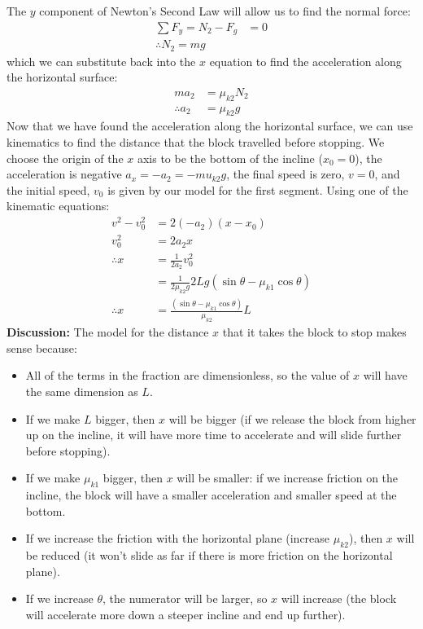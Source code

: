 \begin{example}
The $y$ component of Newton's Second Law will allow us to find the normal force:
\begin{align*}
\sum F_y = N_2 -F_g &=0\\
\therefore N_2 = mg
\end{align*}
which we can substitute back into the $x$ equation to find the acceleration along the horizontal surface:
\begin{align*}
ma_2 &=\mu_{k2}N_2 \\
\therefore a_2&=\mu_{k2}g
\end{align*}
Now that we have found the acceleration along the horizontal surface, we can use kinematics to find the distance that the block travelled before stopping. We choose the origin of the $x$ axis to be the bottom of the incline ($x_0=0$), the acceleration is negative $a_x = -a_2 = -mu_{k2}g$, the final speed is zero, $v=0$, and the initial speed, $v_0$ is given by our model for the first segment. Using one of the kinematic equations:
\begin{align*}
v^2-v_0^2&=2(-a_2)(x-x_0)\\
v_0^2&=2a_2x\\
\therefore x &=\frac{1}{2a_2}v_0^2\\
&=\frac{1}{2\mu_{k2}g}2Lg(\sin\theta-\mu_{k1}\cos\theta)\\
\therefore x&=\frac{(\sin\theta-\mu_{k1}\cos\theta)}{\mu_{k2}}L
\end{align*}
\textbf{Discussion:} The model for the distance $x$ that it takes the block to stop makes sense because:
\begin{itemize}
\item All of the terms in the fraction are dimensionless, so the value of $x$ will have the same dimension as $L$. 
\item If we make $L$ bigger, then $x$ will be bigger (if we release the block from higher up on the incline, it will have more time to accelerate and will slide further before stopping).
\item If we make $\mu_{k1}$ bigger, then $x$ will be smaller: if we increase friction on the incline, the block will have a smaller acceleration and smaller speed at the bottom.
\item If we increase the friction with the horizontal plane (increase $\mu_{k2}$), then $x$ will be reduced (it won't slide as far if there is more friction on the horizontal plane).
\item If we increase $\theta$, the numerator will be larger, so $x$ will increase (the block will accelerate more down a steeper incline and end up further).
\end{itemize} 

\end{example}


